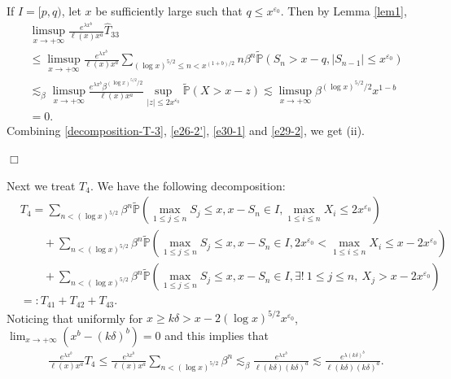 \documentclass[11pt]{article}
\numberwithin{equation}{section}
\begin{document}
If $I= [p, q)$, let $x$ be sufficiently large such that $q\leq x^{\varepsilon_0}$. Then by Lemma \ref{lem1},
\begin{align}\label{e29-2}
	& \limsup_{x\to+\infty} \frac{e^{\lambda x^b}}{\ell(x)x^a }  \widehat{T}_{33} \nonumber\\
	&\leq     \limsup_{x\to+\infty}  \frac{e^{\lambda x^b}}{\ell(x)x^a } \sum_{(\log x)^{5/2}\leq n<x^{(1+b)/2}}  n \beta^{n} \widetilde{\mathbb{P}}\left(S_n>x-q,   |S_{n-1}|\leq x^{\varepsilon_0}\right)\nonumber\\
	& \lesssim_\beta  \limsup_{x\to+\infty}  \frac{e^{\lambda x^b}\beta^{(\log x)^{5/2}/2}  }{\ell(x)x^a }  \sup_{|z| \leq 2x^{\varepsilon_0} } \widetilde{\mathbb{P}}(X>x-z)    \lesssim \limsup_{x\to+\infty} \beta^{(\log x)^{5/2}/2} x^{1-b}  \nonumber\\
	&= 0. 
\end{align}
Combining  \eqref{decomposition-T-3}, \eqref{e26-2'}, \eqref{e30-1} and \eqref{e29-2}, we get (ii).

\hfill$\Box$

Next we treat $T_4$. We have the following decomposition:
\begin{align}\label{decomposition-T-4}
	&T_4= \sum_{n< (\log x)^{5/2}}  \beta^{n}\widetilde{\mathbb{P}}\left(\max_{1\leq j \leq n} S_j \leq x, x-S_n\in I,  \max_{1\leq i\leq n} X_i \leq 2x^{\varepsilon_0}\right) \nonumber\\
	&\qquad + \sum_{n< (\log x)^{5/2}}  \beta^{n}\widetilde{\mathbb{P}}\left(\max_{1\leq j \leq n} S_j \leq x, x-S_n\in I, 2x^{\varepsilon_0}<\max_{1\leq i\leq n} X_i  \leq x-2x^{\varepsilon_0}\right)\nonumber\\
	&\qquad +  \sum_{n< (\log x)^{5/2}}  \beta^{n}  \widetilde{\mathbb{P}}\left(\max_{1\leq j \leq n} S_j \leq x, x-S_n\in I,  \exists !\ 1\leq j\leq n,\  X_j > x-2x^{\varepsilon_0}\right)\nonumber\\
	&=: T_{41}+T_{42}+T_{43}. 
\end{align}
Noticing that uniformly for $x\geq k\delta >x- 2(\log x)^{5/2} x^{\varepsilon_0}$,  $\lim_{x\to+\infty} (x^b- (k\delta)^b)= 0$ and this implies that 
\begin{align}\label{e34-1}
	& \frac{e^{\lambda x^b}}{\ell(x)x^a } T_{4} \leq   \frac{e^{\lambda x^b}}{\ell(x)x^a }  \sum_{n< (\log x)^{5/2}}  \beta^{n}   \lesssim_\beta  \frac{e^{\lambda x^b}}{\ell(k\delta) (k\delta)^a }   \lesssim \frac{e^{\lambda (k\delta)^b}}{\ell(k\delta) (k\delta)^a}.
\end{align} 
\end{document}

